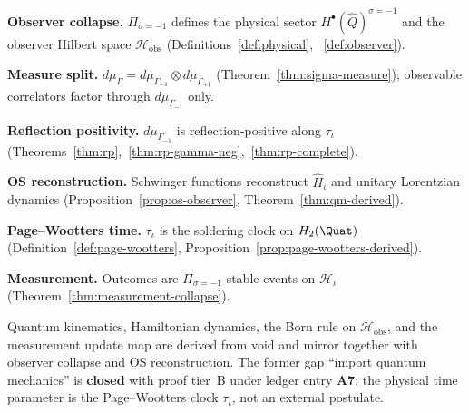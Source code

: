\medskip
\noindent\textbf{Observer collapse.}
$\Pi_{\sigma=-1}$ defines the physical sector
$H^\bullet(\hat Q)^{\sigma=-1}$ and the observer Hilbert space
$\mathcal{H}_{\mathrm{obs}}$ (Definitions~\ref{def:physical},
~\ref{def:observer}).

\medskip
\noindent\textbf{Measure split.}
$d\mu_\Gamma=d\mu_{\Gamma_{-1}}\otimes d\mu_{\Gamma_{+1}}$
(Theorem~\ref{thm:sigma-measure}); observable correlators factor through
$d\mu_{\Gamma_{-1}}$ only.

\medskip
\noindent\textbf{Reflection positivity.}
$d\mu_{\Gamma_{-1}}$ is reflection-positive along $\tau_\iota$
(Theorems~\ref{thm:rp},~\ref{thm:rp-gamma-neg},~\ref{thm:rp-complete}).

\medskip
\noindent\textbf{OS reconstruction.}
Schwinger functions reconstruct $\hat H_\iota$ and unitary Lorentzian
dynamics (Proposition~\ref{prop:os-observer}, Theorem~\ref{thm:qm-derived}).

\medskip
\noindent\textbf{Page--Wootters time.}
$\tau_\iota$ is the soldering clock on $H_2(\Quat)$
(Definition~\ref{def:page-wootters}, Proposition~\ref{prop:page-wootters-derived}).

\medskip
\noindent\textbf{Measurement.}
Outcomes are $\Pi_{\sigma=-1}$-stable events on $\mathcal{H}_\iota$
(Theorem~\ref{thm:measurement-collapse}).

\begin{corollary}\label{cor:qm-origin-closure}
Quantum kinematics, Hamiltonian dynamics, the Born rule on
$\mathcal{H}_{\mathrm{obs}}$, and the measurement update map are derived from
void and mirror together with observer collapse and OS reconstruction. The
former gap ``import quantum mechanics'' is \textbf{closed} with proof tier~B
under ledger entry \textbf{A7}; the physical time parameter is the
Page--Wootters clock $\tau_\iota$, not an external postulate.
\end{corollary}